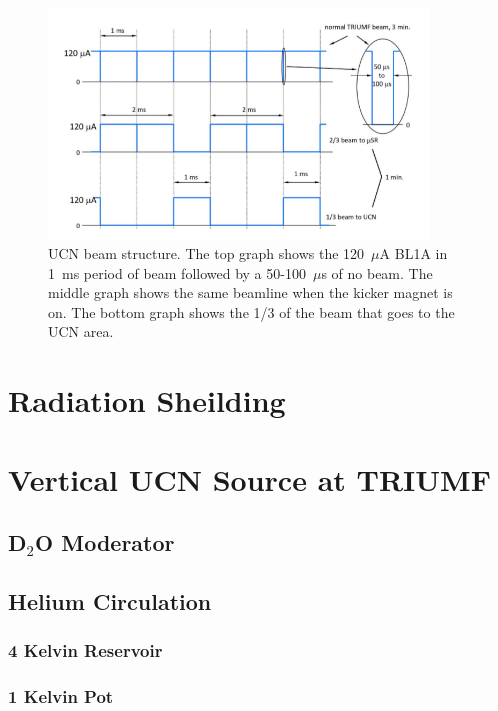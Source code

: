 \begin{figure}[h]
  \centering
  \includegraphics[width=0.9\textwidth]{bl1u.png}
  \caption{UCN beam structure. The top graph shows the 120~$\mu$A BL1A
    in 1~ms period of beam followed by a 50-100~$\mu$s of no
    beam. The middle graph shows the same beamline when the kicker
    magnet is on. The bottom graph shows the 1/3 of the beam that goes
    to the UCN area.}
  \label{fig:bl1u}
\end{figure}

\section{Radiation Sheilding}

\section{Vertical UCN Source at TRIUMF}

\subsection{D$_2$O Moderator}

\subsection{Helium Circulation}

\subsubsection{4 Kelvin Reservoir}

\subsubsection{1 Kelvin Pot}

